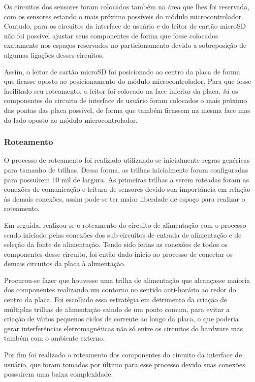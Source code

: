 Os circuitos dos sensores foram colocados também na área que lhes foi reservada, com os sensores estando o mais próximo possíveis do módulo microcontrolador. Contudo, para os circuitos da interface de usuário e do leitor de cartão microSD não foi possível ajustar seus componentes de forma que fosse colocados exatamente nos espaços reservados no particionamento devido a sobreposição de algumas ligações desses circuitos.

Assim, o leitor de cartão microSD foi posicionado ao centro da placa de forma que ficasse oposto ao posicionamento do módulo microcontrolador. Para que fosse facilitado seu roteamento, o leitor foi colocado na face inferior da placa. Já os componentes do circuito de interface de usuário foram colocados o mais próximo das pontas das placa possível, de forma que também ficassem na mesma face mas do lado oposto ao módulo microcontrolador.


\subsubsection{Roteamento}

O processo de roteamento foi realizado utilizando-se inicialmente regras genéricas para tamanho de trilhas. Dessa forma, as trilhas inicialmente foram configuradas para possuírem 10 mil de largura. As primeiras trilhas a serem roteadas foram as conexões de comunicação e leitura de sensores devido sua importância em relação às demais conexões, assim pode-se ter maior liberdade de espaço para realizar o roteamento. 

Em seguida, realizou-se o roteamento do circuito de alimentação com o processo sendo iniciado pelas conexões dos sub-circuitos de entrada de alimentação e de seleção da fonte de alimentação. Tendo sido feitas as conexões de todos os componentes desse circuito, foi então dado início ao processo de conectar os demais circuitos da placa à alimentação.

Procurou-se fazer que houvesse uma trilha de alimentação que alcançasse maioria dos componentes realizando um contorno no sentido anti-horário ao redor do centro da placa. Foi escolhido essa estratégia em detrimento da criação de múltiplas trilhas de alimentação saindo de um ponto comum, para evitar a criação de vários pequenos ciclos de corrente ao longo da placa, o que poderia gerar interferências eletromagnéticas não só entre os circuitos do hardware mas também com o ambiente externo. 

Por fim foi realizado o roteamento dos componentes do circuito da interface de usuário, que foram tomados por último para esse processo devido suas conexões possuírem uma baixa complexidade. 



